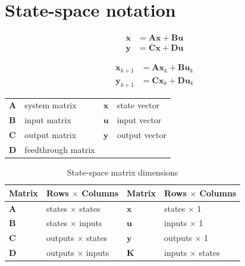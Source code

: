 \documentclass[10pt,conference,compsoc]{IEEEtran}
\newcommand{\mtx}[1] {\bm #1}
\begin{document}
\section{State-space notation}

\begin{align}
  \dot{\mtx{x}} &= \mtx{A}\mtx{x} + \mtx{B}\mtx{u} \label{eq:ss_ctrl_x} \\
  \mtx{y} &= \mtx{C}\mtx{x} + \mtx{D}\mtx{u} \label{eq:ss_ctrl_y}
\end{align}

\begin{align}
  \mtx{x}_{k+1} &= \mtx{A}\mtx{x}_k + \mtx{B}\mtx{u}_k \label{eq:ssz_ctrl_x} \\
  \mtx{y}_{k+1} &= \mtx{C}\mtx{x}_k + \mtx{D}\mtx{u}_k \label{eq:ssz_ctrl_y}
\end{align}

\begin{table}[ht]
  \renewcommand{\arraystretch}{1.3}
  \centering
  \begin{tabulary}{\linewidth}{LLLL}
    $\mtx{A}$ & system matrix      & $\mtx{x}$ & state vector \\
    $\mtx{B}$ & input matrix       & $\mtx{u}$ & input vector \\
    $\mtx{C}$ & output matrix      & $\mtx{y}$ & output vector \\
    $\mtx{D}$ & feedthrough matrix &  \\
  \end{tabulary}
  \label{tab:ss_def}
\end{table}

\begin{table}[ht]
  \caption{State-space matrix dimensions}
  \renewcommand{\arraystretch}{1.5}
  \centering
  \begin{tabular}{|ll|ll|}
    \hline
    \textbf{Matrix} & \textbf{Rows $\times$ Columns} &
    \textbf{Matrix} & \textbf{Rows $\times$ Columns} \\
    \hline
    $\mtx{A}$ & states $\times$ states & $\mtx{x}$ & states $\times$ 1 \\
    $\mtx{B}$ & states $\times$ inputs & $\mtx{u}$ & inputs $\times$ 1 \\
    $\mtx{C}$ & outputs $\times$ states & $\mtx{y}$ & outputs $\times$ 1 \\
    $\mtx{D}$ & outputs $\times$ inputs & $\mtx{K}$ & inputs $\times$ states \\
    \hline
  \end{tabular}
  \label{tab:ss_matrix_dims}
\end{table}
\end{document}
